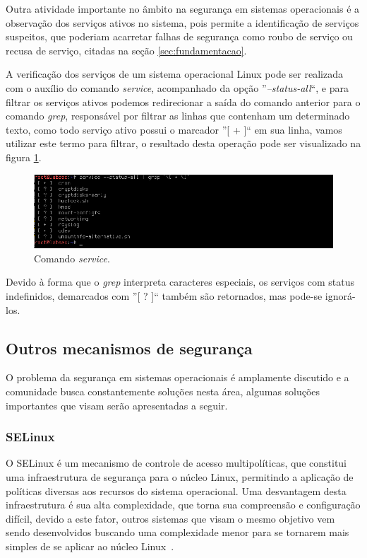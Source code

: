 \documentclass[
	12pt,				%
	oneside,   	        %
	a4paper,			%
	english,			%
	french,				%
	spanish,			%
	brazil,				%
	]{pacotes/abntex2}
\begin{document}
Outra atividade importante no âmbito na segurança em sistemas operacionais é a observação dos serviços ativos no sistema, pois permite a identificação de serviços suspeitos, que poderiam acarretar falhas de segurança como roubo de serviço ou recusa de serviço, citadas na seção \ref{sec:fundamentacao}.

A verificação dos serviços de um sistema operacional Linux pode ser realizada com o auxílio do comando \textit{service}, acompanhado da opção ''\textit{--status-all}``, e para filtrar os serviços ativos podemos redirecionar a saída do comando anterior para o comando \textit{grep}, responsável por filtrar as linhas que contenham um determinado texto, como todo serviço ativo possui o marcador ''[ + ]`` em sua linha, vamos utilizar este termo para filtrar, o resultado desta operação pode ser visualizado na figura \ref{fig:service}.

\begin{figure}[H]
  \centering
  \includegraphics[scale=0.7]{figuras/service.png}
  \caption{Comando \textit{service}.}
  \label{fig:service}
\end{figure}

Devido à forma que o \textit{grep} interpreta caracteres especiais, os serviços com status indefinidos, demarcados com ''[ ? ]`` também são retornados, mas pode-se ignorá-los.

\subsection{Outros mecanismos de segurança}
O problema da segurança em sistemas operacionais é amplamente discutido e a comunidade busca constantemente soluções nesta área, algumas soluções importantes que visam serão apresentadas a seguir.

\subsubsection{SELinux}
O SELinux é um mecanismo de controle de acesso multipolíticas, que constitui uma infraestrutura de segurança para o núcleo Linux, permitindo a aplicação de políticas diversas aos recursos do sistema operacional. Uma desvantagem desta infraestrutura é sua alta complexidade, que torna sua compreensão e configuração difícil, devido a este fator, outros sistemas que visam o mesmo objetivo vem sendo desenvolvidos buscando uma complexidade menor para se tornarem mais simples de se aplicar ao núcleo Linux~\cite{maziero2019}.
\end{document}
